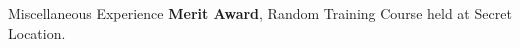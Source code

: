 \begin{rubric}{Miscellaneous Experience}
\entry*[2002] \textbf{Merit Award}, Random Training Course held at Secret Location.


\end{rubric}